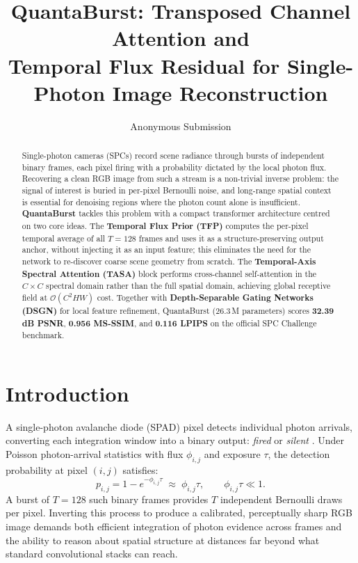 \documentclass[10pt,twocolumn,letterpaper]{article}
\begin{document}
\title{QuantaBurst: Transposed Channel Attention and\\
  Temporal Flux Residual for Single-Photon Image Reconstruction}

\author{Anonymous Submission}
\date{}
\maketitle

\begin{abstract}
Single-photon cameras (SPCs) record scene radiance through bursts of
independent binary frames, each pixel firing with a probability
dictated by the local photon flux.  Recovering a clean RGB image from
such a stream is a non-trivial inverse problem: the signal of interest
is buried in per-pixel Bernoulli noise, and long-range spatial context
is essential for denoising regions where the photon count alone is
insufficient.
\textbf{QuantaBurst} tackles this problem with a compact
transformer architecture centred on two core ideas.
The \textbf{Temporal Flux Prior (TFP)} computes the per-pixel
temporal average of all $T{=}128$ frames and uses it as a
structure-preserving output anchor, without injecting it as an input
feature; this eliminates the need for the network to re-discover
coarse scene geometry from scratch.
The \textbf{Temporal-Axis Spectral Attention (TASA)} block performs
cross-channel self-attention in the $C{\times}C$ spectral domain
rather than the full spatial domain, achieving global receptive field
at $\mathcal{O}(C^2HW)$ cost.
Together with \textbf{Depth-Separable Gating Networks (DSGN)} for
local feature refinement, QuantaBurst (26.3\,M parameters) scores
\textbf{32.39\,dB PSNR}, \textbf{0.956 MS-SSIM}, and
\textbf{0.116 LPIPS} on the official SPC Challenge benchmark.
\end{abstract}

\section{Introduction}

A single-photon avalanche diode (SPAD) pixel detects individual
photon arrivals, converting each integration window into a binary
output: \emph{fired} or \emph{silent}
\cite{charbon2014spad,morimoto2020megapixel}.
Under Poisson photon-arrival statistics with flux $\phi_{i,j}$ and
exposure $\tau$, the detection probability at pixel $(i,j)$ satisfies:
\begin{equation}
  p_{i,j} = 1 - e^{-\phi_{i,j}\tau}
    \;\approx\; \phi_{i,j}\tau, \qquad \phi_{i,j}\tau \ll 1.
  \label{eq:spad}
\end{equation}
A burst of $T{=}128$ such binary frames provides $T$ independent
Bernoulli draws per pixel.  Inverting this process to produce a
calibrated, perceptually sharp RGB image demands both efficient
integration of photon evidence across frames and the ability to
reason about spatial structure at distances far beyond what
standard convolutional stacks can reach.
\end{document}
